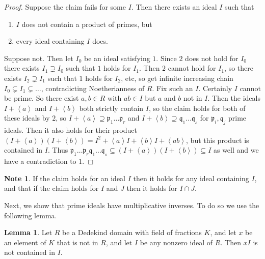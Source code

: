 \documentclass{article}
\newcommand{\rb}[1]{\left( #1 \right)}
\newcommand{\ab}[1]{\left\langle #1 \right\rangle}
\theoremstyle{definition}\newtheorem{definition}{Definition}[subsection]
\theoremstyle{definition}\newtheorem{remark}[definition]{Remark}
\theoremstyle{definition}\newtheorem*{example}{Example}
\theoremstyle{definition}\newtheorem*{note}{Note}
\newtheorem{lemma}[definition]{Lemma}
\begin{document}
\begin{proof}
Suppose the claim fails for some $ I $. Then there exists an ideal $ I $ such that
\begin{enumerate}
\item $ I $ does not contain a product of primes, but
\item every ideal containing $ I $ does.
\end{enumerate}
Suppose not. Then let $ I_0 $ be an ideal satisfying $ 1 $. Since $ 2 $ does not hold for $ I_0 $ there exists $ I_1 \supsetneq I_0 $ such that $ 1 $ holds for $ I_1 $. Then $ 2 $ cannot hold for $ I_1 $, so there exists $ I_2 \supsetneq I_1 $ such that $ 1 $ holds for $ I_2 $, etc, so get infinite increasing chain $ I_0 \subsetneq I_1 \subsetneq \dots $, contradicting Noetherianness of $ R $. Fix such an $ I $. Certainly $ I $ cannot be prime. So there exist $ a, b \in R $ with $ ab \in I $ but $ a $ and $ b $ not in $ I $. Then the ideals $ I + \ab{a} $ and $ I + \ab{b} $ both strictly contain $ I $, so the claim holds for both of these ideals by $ 2 $, so $ I + \ab{a} \supseteq \mathfrak{p}_1 \dots \mathfrak{p}_r $ and $ I + \ab{b} \supseteq \mathfrak{q}_1 \dots \mathfrak{q}_s $ for $ \mathfrak{p}_i, \mathfrak{q}_j $ prime ideals. Then it also holds for their product $ \rb{I + \ab{a}}\rb{I + \ab{b}} = I^2 + \ab{a}I + \ab{b}I + \ab{ab} $, but this product is contained in $ I $. Thus $ \mathfrak{p}_1 \dots \mathfrak{p}_r\mathfrak{q}_1 \dots \mathfrak{q}_s \subseteq \rb{I + \ab{a}}\rb{I + \ab{b}} \subseteq I $ as well and we have a contradiction to $ 1 $.
\end{proof}

\begin{note}
If the claim holds for an ideal $ I $ then it holds for any ideal containing $ I $, and that if the claim holds for $ I $ and $ J $ then it holds for $ I \cap J $.
\end{note}

Next, we show that prime ideals have multiplicative inverses. To do so
we use the following lemma.

\begin{lemma}
\label{lem:11.1.7}
Let $ R $ be a Dedekind domain with field of fractions $ K $, and let $ x $ be an element of $ K $ that is not in $ R $, and let $ I $ be any nonzero ideal of $ R $. Then $ xI $ is not contained in $ I $.
\end{lemma}
\end{document}
